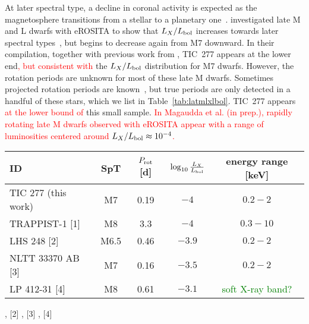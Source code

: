 \documentclass[twocolumn]{aastex631}
\begin{document}
At later spectral type, a decline in coronal activity is expected as the magnetosphere transitions from a stellar to a planetary one~\citep{pineda2017panchromatic}. \citet{stelzer2022first} investigated late M and L dwarfs with eROSITA to show that $L_X/L_{\rm bol}$ increases towards later spectral types~\citep{magaudda2022firsta}, but begins to decrease again from M7 downward. In their compilation, together with previous work from \citet{stelzer2012ultracool, cook2014trends, deluca2020extras, williams2014trends, berger2008simultaneous}, TIC~277 appears at the lower end\textcolor{red}{, but consistent with} the $L_X/L_{\rm bol}$ distribution for M7 dwarfs. However, the rotation periods are unknown for most of these late M dwarfs. Sometimes projected rotation periods are known~\citep{cook2014trends}, but true periods are only detected in a handful of these stars, which we list in Table~\ref{tab:latmlxlbol}. TIC~277 appears \textcolor{red}{at the lower bound of} this small sample. \textcolor{red}{In Magaudda et al. (in prep.), rapidly rotating late M dwarfs observed with eROSITA appear with a range of luminosities centered around $L_X/L_{\rm bol}\approx 10^{-4}$.} 

\begin{table*}[]
    \centering
    \caption{Late M dwarfs with known rotation period and X-ray luminosity.}
    \begin{tabular}{lcccc}
        ID & SpT &$P_{\rm rot}$ [d] & $\log_{10} \frac{L_X}{L_{\rm bol}} $ & energy range [keV]\\\hline
        TIC 277 (this work) & M7 & 0.19 & $-4$ & $0.2-2$ \\
        TRAPPIST-1 [1] & M8 & 3.3 & $-4$ & $0.3-10$\\
        LHS 248 [2] & M6.5 & 0.46 & $-3.9$ & $0.2-2$\\
        NLTT 33370 AB [3] & M7 & 0.16 & $-3.5$ & $0.2-2$ \\
        LP 412-31  [4] & M8 & 0.61 & $-3.1$& \textcolor{green}{soft X-ray band?}\\\hline
    \end{tabular}
     \footnotesize
     \vspace{0.1cm}\newline
    [1] \citet{brown2023coronal}, 
    [2] \citet{cook2014trends}, 
    [3] \citet{williams2015simultaneous}, 
    [4] \citet{stelzer2006simultaneous}    
    \label{tab:latmlxlbol}
\end{table*}
\end{document}
